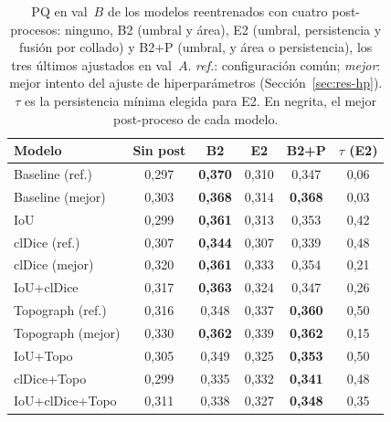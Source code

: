 \begin{table}[htbp]
\centering
\small
\begin{tabular}{@{}lccccc@{}}
\toprule
Modelo & Sin post & B2 & E2 & B2+P & $\tau$ (E2)\\
\midrule
Baseline (ref.) & 0,297 & \textbf{0,370} & 0,310 & 0,347 & 0,06\\
Baseline (mejor) & 0,303 & \textbf{0,368} & 0,314 & \textbf{0,368} & 0,03\\
IoU & 0,299 & \textbf{0,361} & 0,313 & 0,353 & 0,42\\
clDice (ref.) & 0,307 & \textbf{0,344} & 0,307 & 0,339 & 0,48\\
clDice (mejor) & 0,320 & \textbf{0,361} & 0,333 & 0,354 & 0,21\\
IoU+clDice & 0,317 & \textbf{0,363} & 0,324 & 0,347 & 0,26\\
\midrule
Topograph (ref.) & 0,316 & 0,348 & 0,337 & \textbf{0,360} & 0,50\\
Topograph (mejor) & 0,330 & \textbf{0,362} & 0,339 & \textbf{0,362} & 0,15\\
IoU+Topo & 0,305 & 0,349 & 0,325 & \textbf{0,353} & 0,50\\
clDice+Topo & 0,299 & 0,335 & 0,332 & \textbf{0,341} & 0,48\\
IoU+clDice+Topo & 0,311 & 0,338 & 0,327 & \textbf{0,348} & 0,35\\
\bottomrule
\end{tabular}
\caption{PQ en val~$B$ de los modelos reentrenados con cuatro
post-procesos: ninguno, B2 (umbral y área), E2 (umbral, persistencia y
fusión por collado) y B2+P (umbral, y área o persistencia), los tres
últimos ajustados en val~$A$. \emph{ref.}: configuración común;
\emph{mejor}: mejor intento del ajuste de hiperparámetros
(Sección~\ref{sec:res-hp}). $\tau$ es la persistencia mínima elegida
para E2. En negrita, el mejor post-proceso de cada modelo.}
\label{tab:res-e2}
\end{table}

